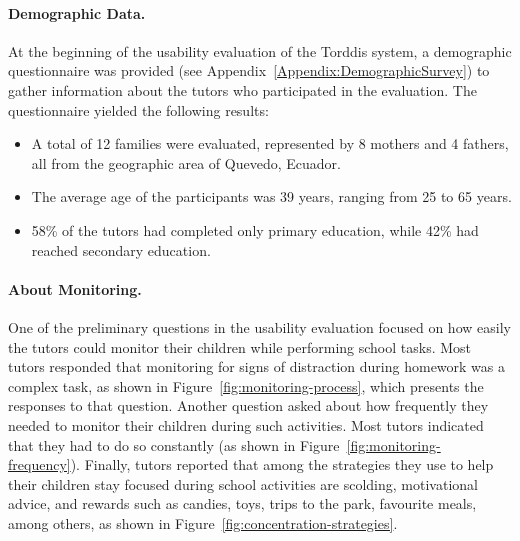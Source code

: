                 \paragraph{Demographic Data.}
                At the beginning of the usability evaluation of the Torddis system, a demographic questionnaire was provided (see Appendix~\ref{Appendix:DemographicSurvey}) to gather information about the tutors who participated in the evaluation. The questionnaire yielded the following results:
                
                \begin{itemize} 
                    \item A total of 12 families were evaluated, represented by 8 mothers and 4 fathers, all from the geographic area of Quevedo, Ecuador.
                    \item The average age of the participants was 39 years, ranging from 25 to 65 years.
                    \item 58\% of the tutors had completed only primary education, while 42\% had reached secondary education.
                \end{itemize}
                
                \paragraph{About Monitoring.}
                One of the preliminary questions in the usability evaluation focused on how easily the tutors could monitor their children while performing school tasks. Most tutors responded that monitoring for signs of distraction during homework was a complex task, as shown in Figure~\ref{fig:monitoring-process}, which presents the responses to that question. Another question asked about how frequently they needed to monitor their children during such activities. Most tutors indicated that they had to do so constantly (as shown in Figure~\ref{fig:monitoring-frequency}). Finally, tutors reported that among the strategies they use to help their children stay focused during school activities are scolding, motivational advice, and rewards such as candies, toys, trips to the park, favourite meals, among others, as shown in Figure~\ref{fig:concentration-strategies}.
                
